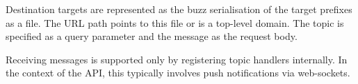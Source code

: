 Destination targets are represented as the buzz serialisation of the target prefixes as a file. The URL path points to this file or is a top-level domain. The topic is specified as a query parameter and the message as the request body.

Receiving messages is supported only by registering topic handlers internally. In the context of the API, this typically involves push notifications via web-sockets.

